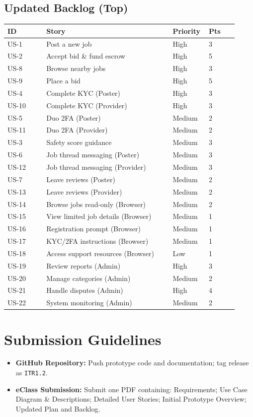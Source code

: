 \documentclass[11pt]{article}
\begin{document}
\subsection{Updated Backlog (Top)}
\begin{longtable}{@{}p{0.16\linewidth} p{0.52\linewidth} p{0.12\linewidth} p{0.12\linewidth}@{}}
\toprule
\textbf{ID} & \textbf{Story} & \textbf{Priority} & \textbf{Pts} \\
\midrule
US-1 & Post a new job & High & 3 \\
US-2 & Accept bid \& fund escrow & High & 5 \\
US-8 & Browse nearby jobs & High & 3 \\
US-9 & Place a bid & High & 5 \\
US-4 & Complete KYC (Poster) & High & 3 \\
US-10 & Complete KYC (Provider) & High & 3 \\
US-5 & Duo 2FA (Poster) & Medium & 2 \\
US-11 & Duo 2FA (Provider) & Medium & 2 \\
US-3 & Safety score guidance & Medium & 3 \\
US-6 & Job thread messaging (Poster) & Medium & 3 \\
US-12 & Job thread messaging (Provider) & Medium & 3 \\
US-7 & Leave reviews (Poster) & Medium & 2 \\
US-13 & Leave reviews (Provider) & Medium & 2 \\
US-14 & Browse jobs read-only (Browser) & Medium & 2 \\
US-15 & View limited job details (Browser) & Medium & 1 \\
US-16 & Registration prompt (Browser) & Medium & 1 \\
US-17 & KYC/2FA instructions (Browser) & Medium & 1 \\
US-18 & Access support resources (Browser) & Low & 1 \\
US-19 & Review reports (Admin) & High & 3 \\
US-20 & Manage categories (Admin) & Medium & 2 \\
US-21 & Handle disputes (Admin) & High & 4 \\
US-22 & System monitoring (Admin) & Medium & 2 \\
\bottomrule
\end{longtable}

\section{Submission Guidelines}
\begin{itemize}[leftmargin=1.4em]
  \item \textbf{GitHub Repository:} Push prototype code and documentation; tag release as \texttt{ITR1.2}.
  \item \textbf{eClass Submission:} Submit one PDF containing: Requirements; Use Case Diagram \& Descriptions; Detailed User Stories; Initial Prototype Overview; Updated Plan and Backlog.
\end{itemize}
\end{document}
